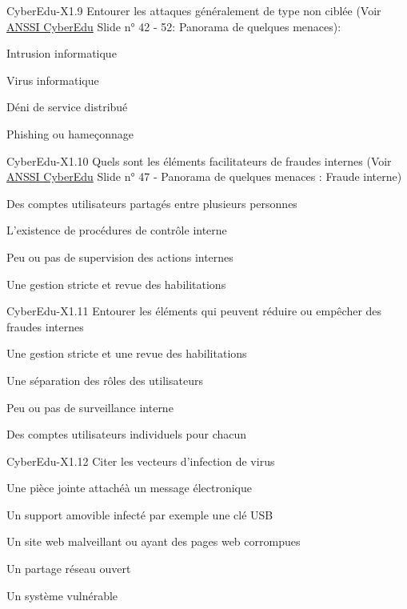 \begin{multi}[multiple=true]{CyberEdu-X1.9}
	Entourer les attaques généralement de type non  ciblée  (Voir \href{https://www.ssi.gouv.fr/administration/formations/cyberedu/contenu-pedagogique-cyberedu/}{ANSSI CyberEdu} Slide n° 42 - 52: Panorama de quelques menaces):
\item 	Intrusion informatique
\item* 	Virus informatique
\item 	Déni de service distribué
\item* 	Phishing ou hameçonnage
\end{multi}

\begin{multi}[multiple=true]{CyberEdu-X1.10}
	Quels sont les éléments facilitateurs de fraudes internes (Voir \href{https://www.ssi.gouv.fr/administration/formations/cyberedu/contenu-pedagogique-cyberedu/}{ANSSI CyberEdu} Slide n° 47 - Panorama de quelques menaces : Fraude interne)
\item* 	Des comptes utilisateurs partagés entre plusieurs personnes
\item 	L'existence de procédures de contrôle interne
\item* 	Peu ou pas de supervision des actions internes
\item 	Une gestion stricte et revue des habilitations
\end{multi}

\begin{multi}[multiple=true]{CyberEdu-X1.11}
	Entourer les éléments qui peuvent réduire ou empêcher des fraudes internes
\item* 	Une gestion stricte et une revue des habilitations
\item* 	Une séparation des rôles des utilisateurs
\item 	Peu ou pas de surveillance interne
\item* 	Des comptes utilisateurs individuels pour chacun
\end{multi}

\begin{multi}[multiple=true]{CyberEdu-X1.12}
	Citer les vecteurs d'infection de virus 
\item* 	Une pièce jointe attachéà un message électronique
\item* 	Un support amovible infecté par exemple une clé USB
\item* 	Un site web malveillant ou ayant des pages web corrompues
\item* 	Un partage réseau ouvert
\item* 	Un système vulnérable
\end{multi}

